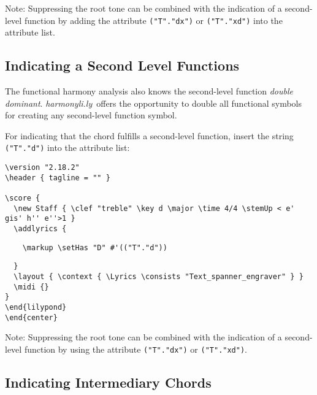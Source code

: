 \documentclass[
  DIV=calc,
  BCOR=5mm,
  12pt,
  headings=small,
  oneside,
  abstract=true,
  toc=bib,
  xcolor=dvipsnames,
  openany,
  ngerman,english]{scrartcl}
\newcommand{\acc}[0]{\textit}
\newcommand{\hlyn}[0]{\textit{harmonyli.ly}}
\begin{document}
Note: Suppressing the root tone can be combined with the indication of a
second-level function by adding the attribute \texttt{("T"."dx")} or
\texttt{("T"."xd")} into the attribute list.

\subsection{Indicating a Second Level Functions}

The functional harmony analysis also knows the second-level function \acc{double
dominant}. \hlyn\ offers the opportunity to double all functional symbols for
creating any second-level function symbol.

For indicating that the chord fulfills a second-level function, insert the string
\texttt{("T"."d")} into the attribute list:

\begin{center}
\end{center}

\begin{scriptsize}
\begin{verbatim}
\version "2.18.2"
\header { tagline = "" }

\score {
  \new Staff { \clef "treble" \key d \major \time 4/4 \stemUp < e' gis' h'' e''>1 }
  \addlyrics { 
\end{verbatim}
{ \color{red} \verb|    \markup \setHas "D" #'(("T"."d"))| }
\begin{verbatim}    
  }
  \layout { \context { \Lyrics \consists "Text_spanner_engraver" } }
  \midi {}
}
\end{lilypond}
\end{center}
\end{verbatim}
\end{scriptsize}

Note: Suppressing the root tone can be combined with the indication of a
second-level function by using the attribute \texttt{("T"."dx")} or
\texttt{("T"."xd")}.

\subsection{Indicating Intermediary Chords}
\end{document}
